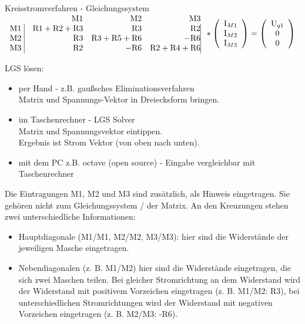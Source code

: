 \documentclass[aspectratio=169, ignorenonframetext]{beamer}
\begin{document}
\begin{frame}{Kreisstromverfahren - Gleichungssystem}
       $\begin{array}{crrrrrr}
        & \text{M1}& \text{M2}& \text{M3}\\
        \text{M1}\  \vline & \text{R}1+\text{R}2+\text{R}3 &     \text{R}3  & \text{R}2 \vline \\
        \text{M2} \ \vline & \text{R}3 & \text{R}3+\text{R}5+\text{R}6     & -\text{R}6 \vline \\
        \text{M3} \ \vline & \text{R}2  & -\text{R}6      &   \text{R}2+\text{R}4+\text{R}6 \vline
\end{array}%
*
\left(\begin{array}{c}
  \text{I}_{M1}\\
  \text{I}_{M2}\\
  \text{I}_{M3}
      \end{array} \right)
= \left( \begin{array}{c}
  \text{U}_{q1}\\
 0\\
 0\\
\end{array}\right)
$

LGS lösen:

\begin{itemize}
 \item per Hand - z.B. gaußsches Eliminationsverfahren\\ Matrix und Spannungs-Vektor in Dreiecksform bringen.
 \item im Taschenrechner - LGS Solver\\
 Matrix und Spannungsvektor eintippen.\\ Ergebnis ist Strom Vektor (von oben nach unten).
 \item mit dem PC z.B. octave (open source) - Eingabe vergleichbar mit Taschenrechner
\end{itemize}
\end{frame}%

Die Eintragungen M1, M2 und M3 sind zusätzlich, als Hinweis eingetragen. Sie gehören nicht zum Gleichungssystem / der Matrix.
An den Kreuzungen stehen zwei unterschiedliche Informationen:

\begin{itemize}
 \item Hauptdiagonale (M1/M1, M2/M2, M3/M3): hier sind die Widerstände der jeweiligen Masche eingetragen.
 \item Nebendiagonalen (z. B. M1/M2) hier sind die Widerstände eingetragen, die sich zwei Maschen teilen. Bei gleicher Stromrichtung an dem Widerstand wird der Widerstand mit positivem Vorzeichen eingetragen (z. B. M1/M2: R3), bei unterschiedlichen Stromrichtungen wird der Widerstand mit negativen Vorzeichen eingetragen (z. B. M2/M3: -R6).
\end{itemize}
\end{document}
